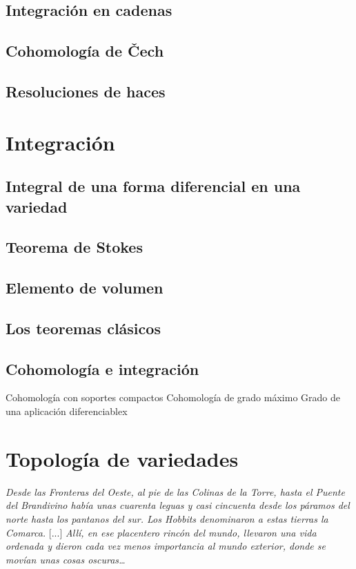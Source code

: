 \documentclass[12pt,a4paper]{book}
\theoremstyle{definition} \newtheorem{defn}[thm]{Definición}
\theoremstyle{definition} \newtheorem{ejemplo}[thm]{Ejemplo}
\theoremstyle{definition} \newtheorem{ejercicio}[thm]{Ejercicio}
\theoremstyle{remark} \newtheorem*{obs}{Observación}
\begin{document}
	  \section{Integración en cadenas}
	  \section{Cohomología de \v{C}ech}
	  \section{Resoluciones de haces}
	  \chapter{Integración}
	  \section{Integral de una forma diferencial en una variedad}
	  \section{Teorema de Stokes}
	  \section{Elemento de volumen}
	  \section{Los teoremas clásicos}
	  \section{Cohomología e integración}
	  Cohomología con soportes compactos
	  Cohomología de grado máximo
	  Grado de una aplicación diferenciablex

	  
	  \appendix
	  \chapter{Topología de variedades}
	  \epigraph{\textit{Desde las Fronteras del Oeste, al pie de las Colinas de la Torre, hasta el Puente del Brandivino había unas cuarenta leguas y casi cincuenta desde los páramos del norte hasta los pantanos del sur. Los Hobbits denominaron a estas tierras la Comarca.} [...] \textit{Allí, en ese placentero rincón del mundo, llevaron una vida ordenada y dieron cada vez menos importancia al mundo exterior, donde se movían unas cosas oscuras\dots}}{}
\end{document}
